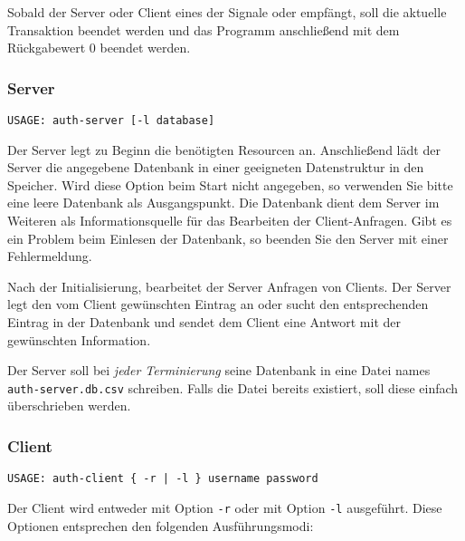 Sobald der Server oder Client eines der Signale  oder
 empfängt, soll die aktuelle Transaktion beendet werden und
das Programm anschließend mit dem Rückgabewert 0 beendet werden.


\subsubsection*{Server}
\begin{verbatim}
USAGE: auth-server [-l database]
\end{verbatim}

Der Server legt zu Beginn die benötigten Resourcen an. Anschließend lädt der
Server die angegebene Datenbank in einer geeigneten Datenstruktur in den
Speicher. Wird diese Option beim Start nicht angegeben, so verwenden Sie bitte
eine leere Datenbank als Ausgangspunkt. Die Datenbank dient dem Server im
Weiteren als Informationsquelle für das Bearbeiten der Client-Anfragen. Gibt es
ein Problem beim Einlesen der Datenbank, so beenden Sie den Server mit einer
Fehlermeldung.

Nach der Initialisierung, bearbeitet der Server Anfragen von Clients. Der
Server legt den vom Client gewünschten Eintrag an oder sucht den entsprechenden
Eintrag in der Datenbank und sendet dem Client eine Antwort mit der gewünschten
Information.

Der Server soll bei \textit{jeder Terminierung} seine Datenbank in eine Datei
names \texttt{auth-server.db.csv} schreiben. Falls die Datei bereits existiert,
soll diese einfach überschrieben werden.


\subsubsection*{Client}
\begin{verbatim}
USAGE: auth-client { -r | -l } username password
\end{verbatim}

Der Client wird entweder mit Option \texttt{-r} oder mit Option \texttt{-l}
ausgeführt. Diese Optionen entsprechen den folgenden Ausführungsmodi:

